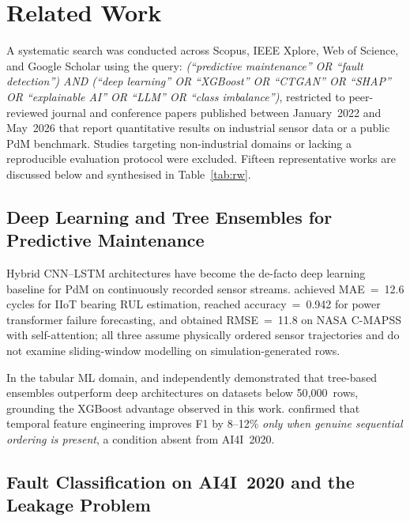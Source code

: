 \documentclass[sensors,article,submit,pdftex,moreauthors]{Definitions/mdpi}
\begin{document}
\section{Related Work}
\label{sec:rw}

A systematic search was conducted across Scopus, IEEE Xplore, Web of
Science, and Google Scholar using the query:
\textit{(``predictive maintenance'' OR ``fault detection'') AND
(``deep learning'' OR ``XGBoost'' OR ``CTGAN'' OR ``SHAP'' OR
``explainable AI'' OR ``LLM'' OR ``class imbalance'')}, restricted
to peer-reviewed journal and conference papers published between
January~2022 and May~2026 that report quantitative results on
industrial sensor data or a public PdM benchmark.
Studies targeting non-industrial domains or lacking a reproducible
evaluation protocol were excluded.
Fifteen representative works are discussed below and synthesised in
Table~\ref{tab:rw}.

\subsection{Deep Learning and Tree Ensembles for Predictive Maintenance}

Hybrid CNN--LSTM architectures have become the de-facto deep learning
baseline for PdM on continuously recorded sensor streams.
\citet{ref-dl-pdm-iot2025} achieved MAE~=~12.6 cycles for IIoT bearing
RUL estimation, \citet{ref-dl-transformer-pdm2025} reached
accuracy~=~0.942 for power transformer failure forecasting, and
\citet{ref-lstm-rul2023} obtained RMSE~=~11.8 on NASA C-MAPSS with
self-attention; all three assume physically ordered sensor trajectories
and do not examine sliding-window modelling on simulation-generated rows.

In the tabular ML domain, \citet{ref-tabular-trees2022} and
\citet{ref-tabular-benchmark2021} independently demonstrated that
tree-based ensembles outperform deep architectures on datasets below
50{,}000~rows, grounding the XGBoost advantage observed in this work.
\citet{ref-pdm-pump-short2025} confirmed that temporal feature
engineering improves F1 by 8--12\% \textit{only when genuine sequential
ordering is present}, a condition absent from AI4I~2020.

\subsection{Fault Classification on AI4I~2020 and the Leakage Problem}
\end{document}
